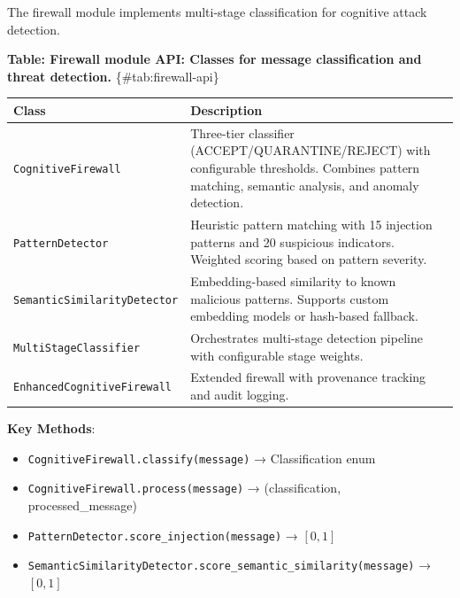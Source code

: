 \documentclass[
]{article}
\newcounter{none} %
\providecommand{\tightlist}{%
  \setlength{\itemsep}{0pt}\setlength{\parskip}{0pt}}
\begin{document}
The firewall module implements multi-stage classification for cognitive
attack detection.

\textbf{Table: Firewall module API: Classes for message classification
and threat detection.} \{\#tab:firewall-api\}

{\def\LTcaptype{none} %
\begin{longtable}[]{@{}
  >{\raggedright\arraybackslash}p{}
  >{\raggedright\arraybackslash}p{}@{}}
\toprule\noalign{}
\begin{minipage}[b]{\linewidth}\raggedright
Class
\end{minipage} & \begin{minipage}[b]{\linewidth}\raggedright
Description
\end{minipage} \\
\midrule\noalign{}
\endhead
\bottomrule\noalign{}
\endlastfoot
\texttt{CognitiveFirewall} & Three-tier classifier
(ACCEPT/QUARANTINE/REJECT) with configurable thresholds. Combines
pattern matching, semantic analysis, and anomaly detection. \\
\texttt{PatternDetector} & Heuristic pattern matching with 15 injection
patterns and 20 suspicious indicators. Weighted scoring based on pattern
severity. \\
\texttt{SemanticSimilarityDetector} & Embedding-based similarity to
known malicious patterns. Supports custom embedding models or hash-based
fallback. \\
\texttt{MultiStageClassifier} & Orchestrates multi-stage detection
pipeline with configurable stage weights. \\
\texttt{EnhancedCognitiveFirewall} & Extended firewall with provenance
tracking and audit logging. \\
\end{longtable}
}

\textbf{Key Methods}:

\begin{itemize}
\tightlist
\item
  \texttt{CognitiveFirewall.classify(message)} → Classification enum
\item
  \texttt{CognitiveFirewall.process(message)} → (classification,
  processed\_message)
\item
  \texttt{PatternDetector.score\_injection(message)} → \([0, 1]\)
\item
  \texttt{SemanticSimilarityDetector.score\_semantic\_similarity(message)}
  → \([0, 1]\)
\end{itemize}
\end{document}
